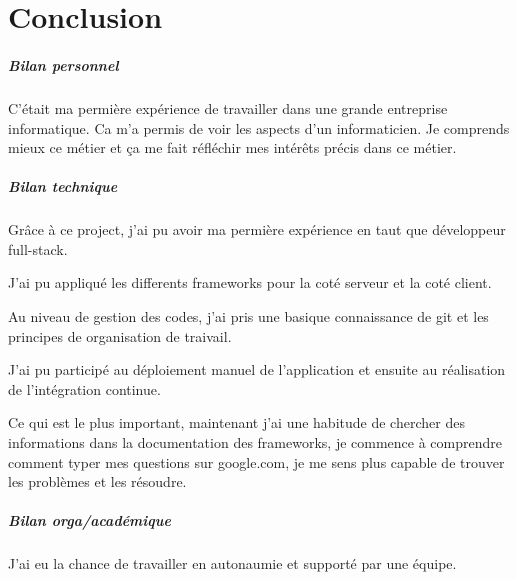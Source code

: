 \chapter*{Conclusion}
\label{chap:Conclusion}

\paragraph{Bilan personnel}
C'était ma permière expérience de travailler dans une grande entreprise informatique.
Ca m'a permis de voir les aspects d'un informaticien.
Je comprends mieux ce métier et ça me fait réfléchir mes intérêts précis dans ce métier.

\paragraph{Bilan technique}
Grâce à ce project, j'ai pu avoir ma permière expérience en taut que développeur full-stack.

J'ai pu appliqué les differents frameworks pour la coté serveur et la coté client.

Au niveau de gestion des codes, j'ai pris une basique connaissance de git et les principes de organisation de traivail.

J'ai pu participé au déploiement manuel de l'application et ensuite au réalisation de l'intégration continue.

Ce qui est le plus important, maintenant j'ai une habitude de chercher des informations dans la documentation des frameworks,
je commence à comprendre comment typer mes questions sur google.com,
je me sens plus capable de trouver les problèmes et les résoudre.

\paragraph{Bilan orga/académique}
J'ai eu la chance de travailler en autonaumie et supporté par une équipe.

